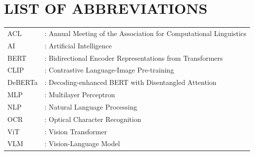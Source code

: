 \newpage
\chapter*{LIST OF ABBREVIATIONS}
\begin{tabular}{l l}
ACL     & : Annual Meeting of the Association for Computational Linguistics\\
AI      & : Artificial Intelligence\\
BERT    & : Bidirectional Encoder Representations from Transformers\\
CLIP    & : Contrastive Language-Image Pre-training\\
DeBERTa & : Decoding-enhanced BERT with Disentangled Attention\\
MLP     & : Multilayer Perceptron\\
NLP     & : Natural Language Processing\\
OCR     & : Optical Character Recognition\\
ViT     & : Vision Transformer\\
VLM     & : Vision-Language Model\\
\end{tabular}
